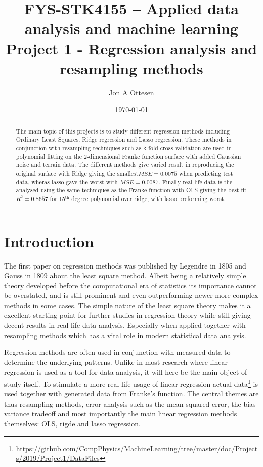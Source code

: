 \documentclass[uio,jmp,amsmath,amssymb,reprint,nofootinbib]{revtex4-1}
\numberwithin{equation}{section}
\begin{document}
\title{FYS-STK4155 – Applied data analysis and machine learning\\ Project 1 - Regression analysis and resampling methods}%

\author{Jon A Ottesen}
\date{\today}

\begin{abstract}
The main topic of this projects is to study different regression methods including Ordinary Least Squares, Ridge regression and Lasso regression. These methods in conjunction with resampling techniques such as k-fold cross-validation are used in polynomial fitting on the 2-dimensional Franke function surface with added Gaussian noise and terrain data. The different methods give varied result in reproducing the original surface with Ridge giving the smallest\(MSE = 0.0075\) when predicting test data, wheras lasso gave the worst with \(MSE = 0.0087\). Finally real-life data is the analysed using the same techniques as the Franke function with OLS giving the best fit \(R^2 = 0.8657\) for 15\(^\text{th}\) degree polynomial over ridge, with lasso preforming worst.

\end{abstract}

\maketitle


\section{Introduction}\label{sec:Introduction}

The first paper on regression methods was published by Legendre in 1805 and Gauss in 1809 about the least square method\cite{wiki:Regression_analysis}. Albeit being a relatively simple theory developed before the computational era of statistics its importance cannot be overstated, and is still prominent and even outperforming newer more complex methods in some cases. The simple nature of the least square theory makes it a excellent starting point for further studies in regression theory while still giving decent results in real-life data-analysis. Especially when applied together with resampling methods which has a vital role in modern statistical data analysis.

Regression methods are often used in conjunction with measured data to determine the underlying patterns. Unlike in most research where linear regression is used as a tool for data-analysis, it will here be the main object of study itself. To stimulate a more real-life usage of linear regression actual data\footnote{\url{https://github.com/CompPhysics/MachineLearning/tree/master/doc/Projects/2019/Project1/DataFiles}} is used together with generated data from  Franke's function. The central themes are thus resampling methods, error analysis such as the mean squared error, the bias-variance tradeoff and most importantly the main linear regression methods themselves: OLS, rigde and lasso regression.
\end{document}
